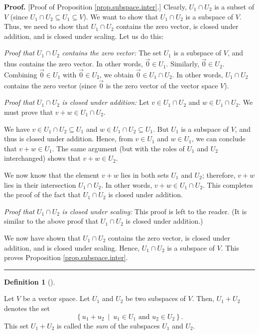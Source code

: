 \documentclass[numbers=enddot,12pt,final,onecolumn,notitlepage]{scrartcl}%
\theoremstyle{definition}
\newtheorem{defi}[theo]{Definition}
\newenvironment{definition}[1][]
{\begin{defi}[#1]\begin{leftbar}}
{\end{leftbar}\end{defi}}
\newenvironment{proof}[1][Proof]{\noindent\textbf{#1.} }{\ \rule{0.5em}{0.5em}}
\begin{document}
\begin{proof}
[Proof of Proposition \ref{prop.subspace.inter}.] Clearly, $U_{1}\cap U_{2}$
is a subset of $V$ (since $U_{1}\cap U_{2}\subseteq U_{1}\subseteq V$). We
want to show that $U_{1}\cap U_{2}$ is a subspace of $V$. Thus, we need to
show that $U_{1}\cap U_{2}$ contains the zero vector, is closed under
addition, and is closed under scaling. Let us do this:

\textit{Proof that }$U_{1}\cap U_{2}$\textit{ contains the zero vector:} The
set $U_{1}$ is a subspace of $V$, and thus contains the zero vector. In other
words, $\overrightarrow{0}\in U_{1}$. Similarly, $\overrightarrow{0}\in U_{2}%
$. Combining $\overrightarrow{0}\in U_{1}$ with $\overrightarrow{0}\in U_{2}$,
we obtain $\overrightarrow{0}\in U_{1}\cap U_{2}$. In other words, $U_{1}\cap
U_{2}$ contains the zero vector (since $\overrightarrow{0}$ is the zero vector
of the vector space $V$).

\textit{Proof that }$U_{1}\cap U_{2}$ \textit{is closed under addition:} Let
$v\in U_{1}\cap U_{2}$ and $w\in U_{1}\cap U_{2}$. We must prove that $v+w\in
U_{1}\cap U_{2}$.

We have $v\in U_{1}\cap U_{2}\subseteq U_{1}$ and $w\in U_{1}\cap
U_{2}\subseteq U_{1}$. But $U_{1}$ is a subspace of $V$, and thus is closed
under addition. Hence, from $v\in U_{1}$ and $w\in U_{1}$, we can conclude
that $v+w\in U_{1}$. The same argument (but with the roles of $U_{1}$ and
$U_{2}$ interchanged) shows that $v+w\in U_{2}$.

We now know that the element $v+w$ lies in both sets $U_{1}$ and $U_{2}$;
therefore, $v+w$ lies in their intersection $U_{1}\cap U_{2}$. In other words,
$v+w\in U_{1}\cap U_{2}$. This completes the proof of the fact that $U_{1}\cap
U_{2}$ is closed under addition.

\textit{Proof that }$U_{1}\cap U_{2}$ \textit{is closed under scaling:} This
proof is left to the reader. (It is similar to the above proof that $U_{1}\cap
U_{2}$ is closed under addition.)

We now have shown that $U_{1}\cap U_{2}$ contains the zero vector, is closed
under addition, and is closed under scaling. Hence, $U_{1}\cap U_{2}$ is a
subspace of $V$. This proves Proposition \ref{prop.subspace.inter}.
\end{proof}

\begin{definition}
\label{def.subspace.sum}Let $V$ be a vector space. Let $U_{1}$ and $U_{2}$ be
two subspaces of $V$. Then, $U_{1}+U_{2}$ denotes the set%
\[
\left\{  u_{1}+u_{2}\ \mid\ u_{1}\in U_{1}\text{ and }u_{2}\in U_{2}\right\}
.
\]
This set $U_{1}+U_{2}$ is called the \textit{sum} of the subspaces $U_{1}$ and
$U_{2}$.
\end{definition}
\end{document}
